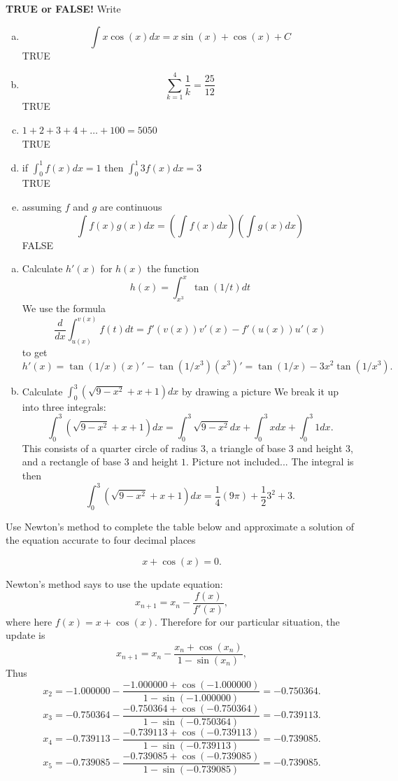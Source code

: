 \documentclass[11pt]{exam}
\theoremstyle{definition}
\begin{document}
\begin{questions}

\addpoints

\question[10]\mbox{}
\textbf{TRUE or FALSE!}  Write 
\begin{enumerate}[(a)]
\item  $$\int x\cos(x)dx = x\sin(x) + \cos(x) + C$$
TRUE
\item  $$\sum_{k=1}^4 \frac{1}{k} = \frac{25}{12}$$
TRUE
\item  $1 + 2 + 3 + 4 + \dots + 100 = 5050$
\\
TRUE
\item  if $\int_0^1 f(x)dx = 1$ then $\int_0^1 3f(x) dx = 3$
\\
TRUE
\item  assuming $f$ and $g$ are continuous
$$\int f(x)g(x)dx = \left(\int f(x)dx\right)\left(\int g(x)dx\right)$$
FALSE
\end{enumerate}

\newpage
\question[10]\mbox{}
\begin{enumerate}[(a)]
\item  Calculate $h'(x)$ for $h(x)$ the function
$$h(x) = \int_{x^3}^x \tan(1/t) dt$$
We use the formula
$$\frac{d}{dx}\int_{u(x)}^{v(x)} f(t)dt = f'(v(x))v'(x)-f'(u(x))u'(x)$$
to get
$$h'(x) = \tan(1/x)(x)' - \tan(1/x^3)(x^3)' = \tan(1/x)-3x^2\tan(1/x^3).$$
\item  Calculate $\int_0^3 (\sqrt{9-x^2} + x + 1)dx$ by drawing a picture
We break it up into three integrals:
$$\int_0^3 (\sqrt{9-x^2} + x + 1)dx = \int_0^3 \sqrt{9-x^2}dx + \int_0^3 xdx + \int_0^3 1dx.$$
This consists of a quarter circle of radius $3$, a triangle of base $3$ and height $3$, and a rectangle of base $3$ and height $1$.  Picture not included...
The integral is then
$$\int_0^3 (\sqrt{9-x^2} + x + 1)dx  = \frac{1}{4}(9\pi) + \frac{1}{2}3^2 + 3.$$
\end{enumerate}

\newpage
\question[10]\mbox{}
Use Newton's method to complete the table below and approximate a solution of the equation accurate to four decimal places

$$x + \cos(x) = 0.$$

Newton's method says to use the update equation:
$$x_{n+1} = x_n - \frac{f(x)}{f'(x)},$$
where here $f(x) = x +\cos(x)$.
Therefore for our particular situation, the update is
$$x_{n+1} = x_n - \frac{x_n+\cos(x_n)}{1-\sin(x_n)},$$
Thus
$$x_2 = -1.000000 - \frac{-1.000000+\cos(-1.000000)}{1-\sin(-1.000000)} = -0.750364.$$
$$x_3 = -0.750364 - \frac{-0.750364+\cos(-0.750364)}{1-\sin(-0.750364)} = -0.739113.$$
$$x_4 = -0.739113 - \frac{-0.739113+\cos(-0.739113)}{1-\sin(-0.739113)} = -0.739085.$$
$$x_5 = -0.739085 - \frac{-0.739085+\cos(-0.739085)}{1-\sin(-0.739085)} = -0.739085.$$



\end{questions}
\end{document}
